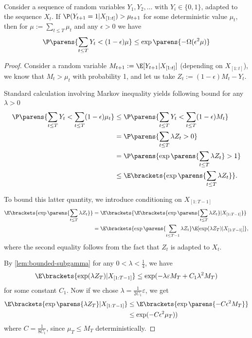 \documentclass[11pt]{article}
\begin{document}
\begin{lemma}
	\label{lem:sum-of-events}
	Consider a sequence of random variables $Y_1, Y_2, \ldots$ with $Y_i \in \{0, 1\}$, adapted to the sequence $X_t$. If $\P(Y_{t+1} = 1 | X_{[1:t]}) > \mu_{t+1}$ for some deterministic value $\mu_t$,  then for $\mu := \sum_{t\leq T} \mu_t$ and any $\epsilon > 0$ we have
	\begin{equation*}
		\P\parens{\sum_{t\leq T} Y_t < (1 - \epsilon)\mu} \leq \exp\parens{-\Omega(\epsilon^2 \mu)}
	\end{equation*}
\end{lemma}
\begin{proof}
	Consider a random variable $M_{t+1} := \E[Y_{t+1} | X_{[1:t]}]$ (depending on $X_{[1:t]}$), we know that $M_t > \mu_t$ with probability 1, and let us take $Z_t := (1 - \epsilon) M_t - Y_t$. 

	Standard calculation involving Markov inequality yields following bound for any $\lambda > 0$
	\begin{align}
		\P\parens{\sum_{t \leq T} Y_t < \sum_{t \leq T} (1 - \epsilon) \mu_t} & \leq \P\parens{\sum_{t \leq T} Y_t < \sum_{t \leq T} (1 - \epsilon) M_t} \nonumber  \\
		& = \P\parens{\sum_{t \leq T} \lambda Z_t > 0} \nonumber \\
		& = \P\parens{\exp\parens{\sum_{t\leq T} \lambda Z_t} > 1} \nonumber \\
		& \leq \E\brackets{\exp\parens{\sum_{t \leq T} \lambda Z_t}}. \label{eq:first}
	\end{align}
	
	To bound this latter quantity, we introduce conditioning on $X_{[1:T-1]}$
	\begin{align}
		\E\brackets{\exp\parens{\sum_{t \leq T} \lambda Z_t}} & = \E\brackets{\E\brackets{\exp\parens{\sum_{t \leq T} \lambda Z_t} | X_{[1:T-1]}}} \nonumber \\
		& = \E\brackets{\exp\parens{\sum_{t \leq T-1} \lambda Z_t} \E[\exp(\lambda Z_T) | X_{[1:T-1]}]}, \label{eq:soe-mgf}
	\end{align}
	where the second equality follows from the fact that $Z_t$ is adapted to $X_t$.
	
	By \cref{lem:bounded-subgamma} for any $0 < \lambda < \frac{1}{4}$, we have 
	\begin{equation*}
	     \E \brackets{ \exp(\lambda Z_T) | X_{[1:T-1]}} \leq \exp(- \lambda \varepsilon M_T  + C_1 \lambda^2 M_T) 
	\end{equation*}
	for some constant $C_1$. 
	Now if we chose $\lambda = \frac{1}{2 C_1} \varepsilon$, we get
	\begin{align}
	    \E\brackets{\exp\parens{\lambda Z_T} | X_{[1:T-1]}} & \leq \E\brackets{\exp\parens{-C \epsilon^2 M_T}} \nonumber \\
	    &  \leq \exp(- C \epsilon^2 \mu_T))
	\end{align}
	where $C=\frac{1}{8 C_1}$, since $\mu_T \leq M_T$ deterministically.


\end{proof}
\end{document}
